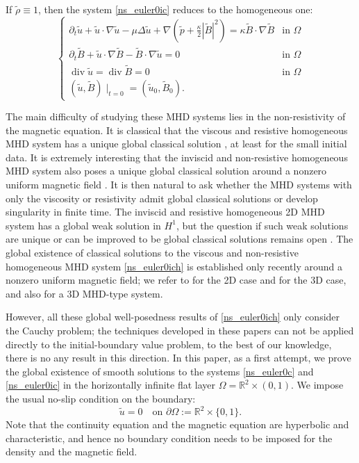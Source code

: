 \documentclass[a4paper,reqno,11pt]{amsart}
\numberwithin{equation}{section}
\begin{document}
If $\tilde\rho\equiv 1$, then the system \eqref{ns_euler0ic} reduces to the homogeneous one:
\begin{equation}\label{ns_euler0ich}
\begin{cases}
 \partial_t\tilde{u}  +   \tilde{u}\cdot \nabla \tilde{u} -\mu\Delta \tilde{u}+\nabla \left(\tilde p+\frac{\kappa}{2}|\tilde{B}|^2 \right) =\kappa\tilde{B} \cdot \nabla \tilde{B} & \text{in } \Omega
\\ \partial_t\tilde{B}  +   \tilde{u} \cdot \nabla \tilde{B} -\tilde{B} \cdot \nabla \tilde{u}=0 & \text{in } \Omega
\\\operatorname{div}{\tilde u}=\operatorname{div}{\tilde B}=0 &\text{in }\Omega
\\ ( \tilde u,   \tilde B)\mid_{t=0}=( \tilde u_0,  \tilde B_0).
\end{cases}
\end{equation}

The main difficulty of studying these MHD systems lies in the non-resistivity of the magnetic equation. It is classical that the viscous and resistive homogeneous MHD system has a unique global classical solution \cite{DL,ST}, at least for the small initial data. It is extremely interesting that the inviscid and non-resistive homogeneous MHD system also poses a unique global classical solution around a nonzero uniform magnetic field \cite{BSS}. It is then natural to ask whether the MHD systems with only the viscosity or resistivity admit global classical solutions or develop singularity in finite time. The inviscid and resistive homogeneous 2D MHD system has a global weak solution in $H^1$, but the question if such weak solutions are unique or can be improved to be global classical solutions remains open \cite{CW,LZH}. The global existence of classical solutions to the viscous and non-resistive homogeneous MHD system \eqref{ns_euler0ich} is established only recently around a nonzero uniform magnetic field; we refer to \cite{LXZ,RWXZ,Z} for the 2D case and \cite{XZ} for the 3D case, and also \cite{LZ,LZT} for a 3D MHD-type system.

However, all these global well-posedness results of \eqref{ns_euler0ich} only consider the Cauchy problem; the techniques developed in these papers can not be applied directly to the initial-boundary value problem, to the best of our knowledge, there is no any result in this direction. In this paper, as a first attempt, we prove the global existence of smooth solutions to the systems \eqref{ns_euler0c} and \eqref{ns_euler0ic} in the horizontally infinite flat layer $\Omega=\mathbb{R}^2\times(0,1)$. We impose the usual no-slip condition on the boundary:
\begin{equation}\label{bounder}
\tilde u=0\quad \text{on }{\partial}\Omega:=\mathbb{R}^2\times \{0,1\}.
\end{equation}
Note that the continuity equation and the magnetic equation are hyperbolic and characteristic, and hence no boundary condition needs to be imposed for the density and the magnetic field.
\end{document}
